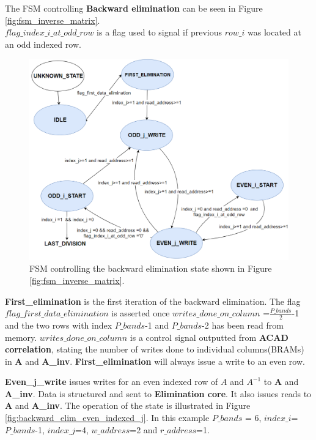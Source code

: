 The FSM controlling \textbf{Backward elimination} can be seen in Figure \ref{fig:fsm_inverse_matrix}.\\ $flag\_index\_i\_at\_odd\_row$ is a flag used to signal if previous $row\_i$ was located at an odd indexed row. 

\begin{figure}[H]
\centering
   \includegraphics[scale=0.4]{images/inverse_hw/fsm_backward_elimination.PNG}
  \caption{FSM controlling the backward elimination state shown in Figure \ref{fig:fsm_inverse_matrix}.  } 
  \label{fig:fsm_backward_elimination}
\end{figure}



\textbf{First\_elimination} is the first iteration of the backward elimination. The flag $flag\_first\_data\_elimination$ is asserted once $writes\_done\_on\_column$ =$\frac{P\_bands}{2}$-1 and the two rows with index $P\_bands$-1 and $P\_bands$-2 has been read from memory. $writes\_done\_on\_column$ is a control signal outputted from \textbf{ACAD correlation}, stating the number of writes done to individual columns(BRAMs) in \textbf{A} and \textbf{A\_inv}.  \textbf{First\_elimination} will always issue a write to an even row. 

\textbf{Even\_j\_write} issues writes for an even indexed row of $A$ and $A^{-1}$ to \textbf{A} and \textbf{A\_inv}. Data is structured and sent to \textbf{Elimination core}. It also issues reads to \textbf{A} and \textbf{A\_inv}. The operation of the state is illustrated in Figure \ref{fig:backward_elim_even_indexed_j}. In this example $P\_bands$ = 6, $index\_i$=$P\_bands$-1, $index\_j$=4, $w\_address$=2 and $r\_address$=1. 

